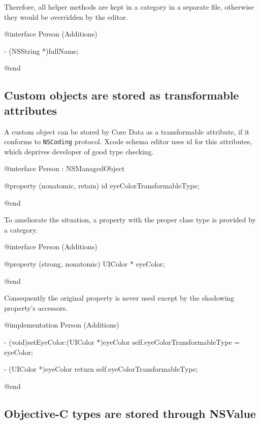 \documentclass[10pt]{extarticle}
\newcommand{\inlinecode}[1]{{\textcolor{TundoraColor}{\texttt{#1}}}}
\begin{document}
Therefore, all helper methods are kept in a category in a separate file, otherwise they would be overridden by the editor.

\begin{codelisting}
@interface Person (Additions)

- (NSString *)fullName;

@end
\end{codelisting}

\subsection{Custom objects are stored as transformable attributes}

A custom object can be stored by Core Data as a transformable attribute, if it conforms to \inlinecode{NSCoding} protocol. Xcode schema editor uses id for this attributes, which deprives developer of good type checking.

\begin{codelisting}
@interface Person : NSManagedObject

@property (nonatomic, retain) id eyeColorTransformableType;

@end
\end{codelisting}

To ameliorate the situation, a property with the proper class type is provided by a category.

\begin{codelisting}
@interface Person (Additions)

@property (strong, nonatomic) UIColor * eyeColor;

@end
\end{codelisting}

Consequently the original property is never used except by the shadowing property's accessors.

\begin{codelisting}
@implementation Person (Additions)

- (void)setEyeColor:(UIColor *)eyeColor
{
    self.eyeColorTransformableType = eyeColor;
}

- (UIColor *)eyeColor
{
    return self.eyeColorTransformableType;
}

@end
\end{codelisting}


\subsection{Objective-C types are stored through NSValue}
\end{document}
